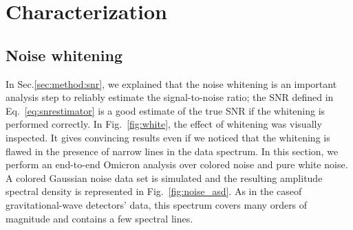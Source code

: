 \section{Characterization} \label{sec:characterization}

\subsection{Noise whitening} \label{sec:characterization:whitening}
In Sec.\ref{sec:method:snr}, we explained that the noise whitening is an important analysis step to reliably estimate the signal-to-noise ratio; the SNR defined in Eq.~\ref{eq:snrestimator} is a good estimate of the true SNR if the whitening is performed correctly. In Fig.~\ref{fig:white}, the effect of whitening was visually inspected. It gives convincing results even if we noticed that the whitening is flawed in the presence of narrow lines in the data spectrum. In this section, we perform an end-to-end Omicron analysis over colored noise and pure white noise. A colored Gaussian noise data set is simulated and the resulting amplitude spectral density is represented in Fig.~\ref{fig:noise_asd}. As in the caseof gravitational-wave detectors' data, this spectrum covers many orders of magnitude and contains a few spectral lines.

